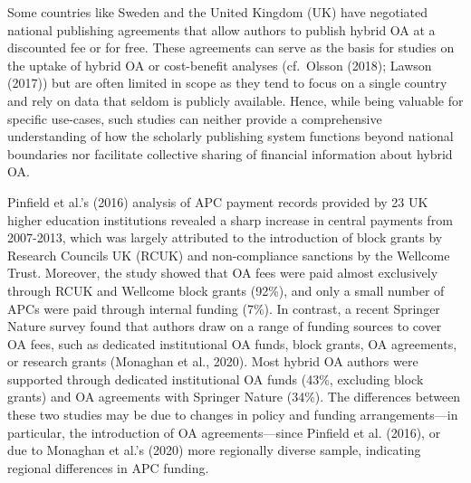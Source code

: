 \documentclass[a4paper,man,floatsintext,longtable,noextraspace,12pt]{apa6}
\begin{document}
Some countries like Sweden and the United Kingdom (UK) have negotiated
national publishing agreements that allow authors to publish hybrid OA
at a discounted fee or for free. These agreements can serve as the basis
for studies on the uptake of hybrid OA or cost-benefit analyses
(cf.~Olsson (2018); Lawson (2017)) but are often limited in scope as
they tend to focus on a single country and rely on data that seldom is
publicly available. Hence, while being valuable for specific use-cases,
such studies can neither provide a comprehensive understanding of how
the scholarly publishing system functions beyond national boundaries nor
facilitate collective sharing of financial information about hybrid OA.

Pinfield et al.'s (2016) analysis of APC payment records provided by 23
UK higher education institutions revealed a sharp increase in central
payments from 2007-2013, which was largely attributed to the
introduction of block grants by Research Councils UK (RCUK) and
non-compliance sanctions by the Wellcome Trust. Moreover, the study
showed that OA fees were paid almost exclusively through RCUK and
Wellcome block grants (92\%), and only a small number of APCs were paid
through internal funding (7\%). In contrast, a recent Springer Nature
survey found that authors draw on a range of funding sources to cover OA
fees, such as dedicated institutional OA funds, block grants, OA
agreements, or research grants (Monaghan et al., 2020). Most hybrid OA
authors were supported through dedicated institutional OA funds (43\%,
excluding block grants) and OA agreements with Springer Nature (34\%).
The differences between these two studies may be due to changes in
policy and funding arrangements---in particular, the introduction of OA
agreements---since Pinfield et al. (2016), or due to Monaghan et al.'s
(2020) more regionally diverse sample, indicating regional differences
in APC funding.
\end{document}
